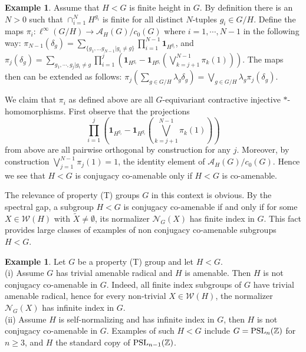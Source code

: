 \documentclass[11pt]{amsart}
\theoremstyle{definition}
\newtheorem{examp}[thm]{Example}
\begin{document}
\begin{examp} Assume that $H<G$ is finite height in $G$. By definition there is an $N>0$ such that $\cap_{i=1}^{N}H^{g_i}$ is finite for all distinct $N$-tuples $g_i\in G/H$. Define the  maps  $\pi_i:\ell^\infty(G/H)\to \mathcal{A}_H(G)/c_0(G)$ where $i=1,\cdots, N-1$ in the following way: $\pi_{N-1}(\delta_g)= \sum_{\{g_1,\hdots g_{N-1}| g_i\neq g\}}\prod_{i=1}^{N-1} \mathbf{1}_{H^{g_i}}$, and ${\pi_j(\delta_g)}= \sum_{g_1,\cdots, g_{j}| g_i\neq g}\prod_{i=1}^{j}\left(\mathbf{1}_{H^{g_i}}-\mathbf{1}_{H^{g_i}} (\bigvee_{k=j+1}^{N-1}\pi_{k}(1))\right)$. The maps then can be extended as follows: $\pi_j(\sum_{g\in G/H}\lambda_g \delta_g)= \bigvee_{g\in G/H} \lambda_g \pi_j(\delta_g)$. 

We claim that $\pi_i$ as defined above are all $G$-equivariant contractive injective $*$-homomorphisms. First observe that the projections  $$\prod_{i=1}^{j}\left(\mathbf{1}_{H^{g_i}}-\mathbf{1}_{H^{g_i}} (\bigvee_{k=j+1}^{N-1}\pi_{k}(1))\right)$$ from above are all pairwise orthogonal by construction for any $j$. Moreover, by construction $\bigvee_{j=1}^{N-1}\pi_j(1)=1$, the identity element of $\mathcal{A}_H(G)/c_0(G)$. Hence we see that $H<G$ is conjugacy co-amenable only if $H<G$ is co-amenable. 
\end{examp}



The relevance of property (T) groups $G$ in this context is obvious. By the spectral gap, a subgroup $H<G$ is conjugacy co-amenable if and only if for some $X\in \mathcal{W}(H)$ with $\tilde X \neq \emptyset$, its normalizer $\mathcal{N}_G(X)$ has finite index in $G$. This fact provides large classes of examples of non conjugacy co-amenable subgroups $H<G$.

\begin{examp}
Let $G$ be a property (T) group and let $H<G$.
\\
(i) Assume $G$ has trivial amenable radical and $H$ is amenable. Then $H$ is not conjugacy co-amenable in $G$. Indeed, all finite index subgroups of $G$ have trivial amenable radical, hence for every non-trivial $X\in \mathcal{W}(H)$, the normalizer $\mathcal{N}_G(X)$ has infinite index in $G$.
\\
(ii) Assume $H$ is self-normalizing and has infinite index in $G$, then $H$ is not conjugacy co-amenable in $G$. Examples of such $H<G$ include $G={\rm PSL}_n(\mathbb Z)$ for $n\ge 3$, and $H$ the standard copy of ${\rm PSL}_{n-1}(\mathbb Z)$.
\end{examp}
\end{document}
